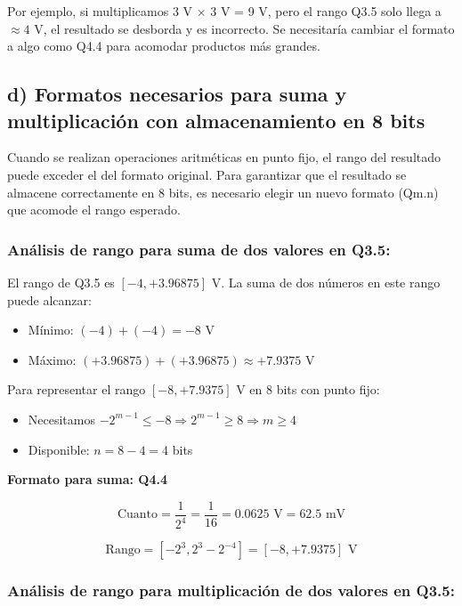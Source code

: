 \documentclass[12pt]{article}
\begin{document}
Por ejemplo, si multiplicamos 3 V $\times$ 3 V = 9 V, pero el rango Q3.5 solo llega a $\approx 4$ V, el resultado se desborda y es incorrecto. Se necesitaría cambiar el formato a algo como Q4.4 para acomodar productos más grandes.
 
\subsection*{d) Formatos necesarios para suma y multiplicación con almacenamiento en 8 bits}
 
Cuando se realizan operaciones aritméticas en punto fijo, el rango del resultado puede exceder el del formato original. Para garantizar que el resultado se almacene correctamente en 8 bits, es necesario elegir un nuevo formato (Qm.n) que acomode el rango esperado.
 
\subsubsection*{Análisis de rango para suma de dos valores en Q3.5:}
 
El rango de Q3.5 es $[-4, +3.96875]$ V. La suma de dos números en este rango puede alcanzar:
\begin{itemize}
    \item Mínimo: $(-4) + (-4) = -8$ V
    \item Máximo: $(+3.96875) + (+3.96875) \approx +7.9375$ V
\end{itemize}
 
Para representar el rango $[-8, +7.9375]$ V en 8 bits con punto fijo:
\begin{itemize}
    \item Necesitamos $-2^{m-1} \leq -8 \Rightarrow 2^{m-1} \geq 8 \Rightarrow m \geq 4$
    \item Disponible: $n = 8 - 4 = 4$ bits
\end{itemize}
 
\textbf{Formato para suma: Q4.4}
 
\begin{equation}
\text{Cuanto} = \frac{1}{2^4} = \frac{1}{16} = 0.0625 \text{ V} = 62.5 \text{ mV}
\end{equation}
 
\begin{equation}
\text{Rango} = \left[-2^{3}, 2^{3} - 2^{-4}\right] = [-8, +7.9375] \text{ V}
\end{equation}
 
\subsubsection*{Análisis de rango para multiplicación de dos valores en Q3.5:}
 
\end{document}
